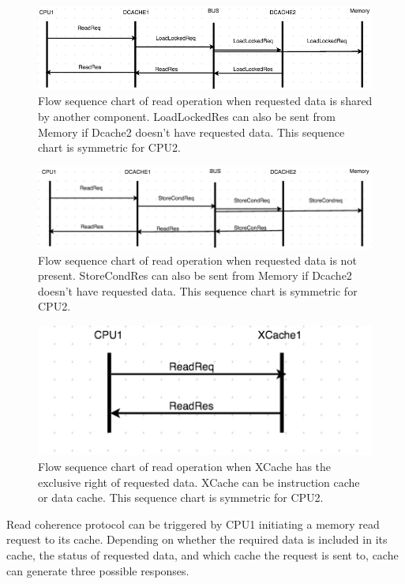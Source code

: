 \documentclass[conference]{IEEEtran}
\begin{document}
 
 \begin{figure} 
 \centerline{
 \includegraphics[width=3.9In]{figures/read3.png}}
 \caption{Flow sequence chart of read operation when requested data is shared by another component. LoadLockedRes can also be sent from Memory if Dcache2 doesn't have requested data. This sequence chart is symmetric for CPU2. }
 \label{read3}
 \end{figure}
 
 \begin{figure} 
 \centerline{
 \includegraphics[width=3.9In]{figures/read2.png}}
 \caption{Flow sequence chart of read operation when requested data is not present. StoreCondRes can also be sent from Memory if Dcache2 doesn't have requested data. This sequence chart is symmetric for CPU2. }
 \label{read2}
 \end{figure}

 \begin{figure} 
 \includegraphics[width=2In]{figures/read1.png}
 \caption{Flow sequence chart of read operation when XCache has the exclusive right of requested data. XCache can be instruction cache or data cache. This sequence chart is symmetric for CPU2. }
 \label{read1}
 \end{figure}

 
Read coherence protocol can be triggered by CPU1 initiating a memory read request to its cache. Depending on whether the required data is included in its cache, the status of requested data,  and which cache the request is sent to, cache can generate three possible responses. 
\end{document}
